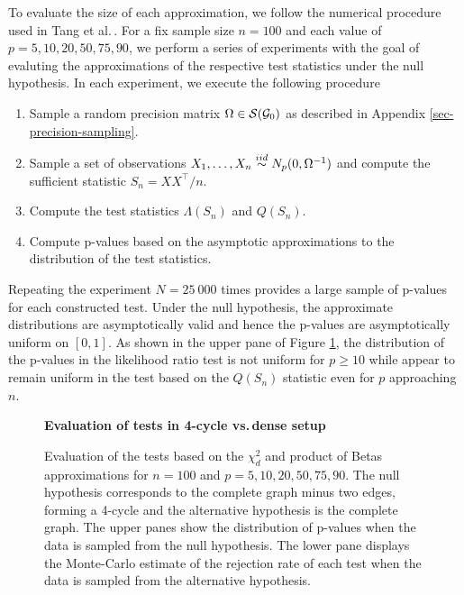 To evaluate the size of each approximation, we follow the numerical procedure used in Tang et al.\,\cite{Tang2020}. For a fix sample size $n = 100$ and each value of $p = 5, 10, 20, 50, 75, 90$, we perform a series of experiments with the goal of evaluting the approximations of the respective test statistics under the null hypothesis. In each experiment, we execute the following procedure
\begin{enumerate}
    \item Sample a random precision matrix $\Omega \in {\mathcal{S}}({\mathcal{G}}_0)$ as described in Appendix \ref{sec-precision-sampling}.
    \item Sample a set of observations $X_1, \ldots, X_n \stackrel{iid}{\sim} N_p(0, \Omega^{-1})$ and compute the sufficient statistic $S_n = X X^\top / n$.
    \item Compute the test statistics $\Lambda(S_n)$ and $Q(S_n)$.
    \item Compute p-values based on the asymptotic approximations to the distribution of the test statistics.
\end{enumerate}
Repeating the experiment $N = 25\ 000$ times provides a large sample of p-values for each constructed test. Under the null hypothesis, the approximate distributions are asymptotically valid and hence the p-values are asymptotically uniform on $[0, 1]$. As shown in the upper pane of Figure \ref{fig-complete-to-4cycle}, the distribution of the p-values in the likelihood ratio test is not uniform for $p \geq 10$ while appear to remain uniform in the test based on the $Q(S_n)$ statistic even for $p$ approaching $n$.

\begin{figure}[!tbp]
    \textbf{Evaluation of tests in 4-cycle vs.\,dense setup}
    \centering
    \qquad
    \caption{Evaluation of the tests based on the $\chi^2_d$ and product of Betas approximations for $n = 100$ and $p = 5, 10, 20, 50, 75, 90$. The null hypothesis corresponds to the complete graph minus two edges, forming a 4-cycle and the alternative hypothesis is the complete graph. The upper panes show the distribution of p-values when the data is sampled from the null hypothesis. The lower pane displays the Monte-Carlo estimate of the rejection rate of each test when the data is sampled from the alternative hypothesis.}
    \label{fig-complete-to-4cycle}
\end{figure}


